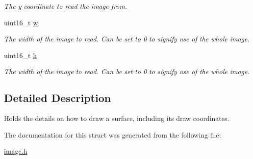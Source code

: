 \begin{DoxyCompactItemize}
\begin{DoxyCompactList}\small\item\em The y coordinate to read the image from. \end{DoxyCompactList}\item 
uint16\+\_\+t \hyperlink{structImage_a159c0d8b6b7100b7d070462720e45356}{w}\hypertarget{structImage_a159c0d8b6b7100b7d070462720e45356}{}\label{structImage_a159c0d8b6b7100b7d070462720e45356}

\begin{DoxyCompactList}\small\item\em The width of the image to read. Can be set to 0 to signify use of the whole image. \end{DoxyCompactList}\item 
uint16\+\_\+t \hyperlink{structImage_a54ddace6d694487278209ac14d9a706b}{h}\hypertarget{structImage_a54ddace6d694487278209ac14d9a706b}{}\label{structImage_a54ddace6d694487278209ac14d9a706b}

\begin{DoxyCompactList}\small\item\em The width of the image to read. Can be set to 0 to signify use of the whole image. \end{DoxyCompactList}\end{DoxyCompactItemize}


\subsection{Detailed Description}
Holds the details on how to draw a surface, including its draw coordinates. 

The documentation for this struct was generated from the following file\+:\begin{DoxyCompactItemize}
\item 
\hyperlink{image_8h}{image.\+h}\end{DoxyCompactItemize}
